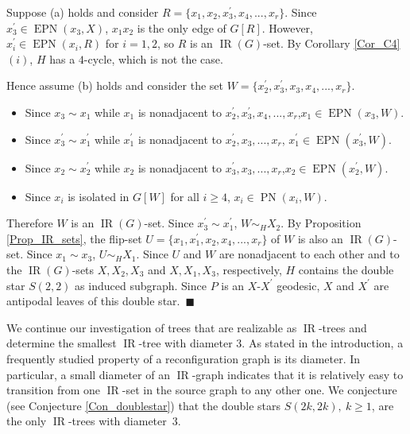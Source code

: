 \documentclass[12pt]{article}%
\begin{document}
Suppose (a) holds and consider $R=\{x_{1},x_{2},x_{3}^{\prime},x_{4}%
,...,x_{r}\}$. Since $x_{3}^{\prime}\in\operatorname{EPN}(x_{3},X)$,
$x_{1}x_{2}$ is the only edge of $G[R]$. However, $x_{i}^{\prime}%
\in\operatorname{EPN}(x_{i},R)$ for $i=1,2$, so $R$ is an $\operatorname{IR}%
(G)$-set. By Corollary \ref{Cor_C4}$(i)$, $H$ has a $4$-cycle, which is not
the case.

Hence assume (b) holds and consider the set $W=\{x_{2}^{\prime},x_{3}^{\prime
},x_{3},x_{4},...,x_{r}\}$.

\begin{itemize}
\item[$\ast$] Since $x_{3}\sim x_{1}$ while $x_{1}$ is nonadjacent to
$x_{2}^{\prime},x_{3}^{\prime},x_{4},...,x_{r}$,\hspace{0.1in}$x_{1}%
\in\operatorname{EPN}(x_{3},W)$.

\item[$\ast$] Since $x_{3}^{\prime}\sim x_{1}^{\prime}$ while $x_{1}^{\prime}$
is nonadjacent to $x_{2}^{\prime},x_{3},...,x_{r}$,\hspace{0.1in}%
$x_{1}^{\prime}\in\operatorname{EPN}(x_{3}^{\prime},W)$.

\item[$\ast$] Since $x_{2}\sim x_{2}^{\prime}$ while $x_{2}$ is nonadjacent to
$x_{3}^{\prime},x_{3},...,x_{r}$,\hspace{0.1in}$x_{2}\in\operatorname{EPN}%
(x_{2}^{\prime},W)$.

\item[$\ast$] Since $x_{i}$ is isolated in $G[W]$ for all $i\geq4$, $x_{i}%
\in\operatorname{PN}(x_{i},W)$.
\end{itemize}

\noindent Therefore $W$ is an $\operatorname{IR}(G)$-set. Since $x_{3}%
^{\prime}\sim x_{1}^{\prime}$, $W\sim_{H}X_{2}$. By Proposition
\ref{Prop_IR_sets}, the flip-set $U=\{x_{1},x_{1}^{\prime},x_{2}%
,x_{4},...,x_{r}\}$ of $W$ is also an $\operatorname{IR}(G)$-set. Since
$x_{1}\sim x_{3}$, $U\sim_{H}X_{1}$. Since $U$ and $W$ are nonadjacent to each
other and to the $\operatorname{IR}(G)$-sets $X,X_{2},X_{3}$ and
$X,X_{1},X_{3}$, respectively, $H$ contains the double star $S(2,2)$ as
induced subgraph. Since $P$ is an $X$-$X^{\prime}$ geodesic, $X$ and
$X^{\prime}$ are antipodal leaves of this double star.~$\blacksquare$

\bigskip

We continue our investigation of trees that are realizable as
$\operatorname{IR}$-trees and determine the smallest $\operatorname{IR}$-tree
with diameter $3$. As stated in the introduction, a frequently studied
property of a reconfiguration graph is its diameter. In particular, a small
diameter of an $\operatorname{IR}$-graph indicates that it is relatively easy
to transition from one $\operatorname{IR}$-set in the source graph to any
other one. \label{Wednesday} We conjecture (see Conjecture
\ref{Con_doublestar}) that the double stars $S(2k,2k),\ k\geq1$, are the only
$\operatorname{IR}$-trees with diameter~$3$.
\end{document}
